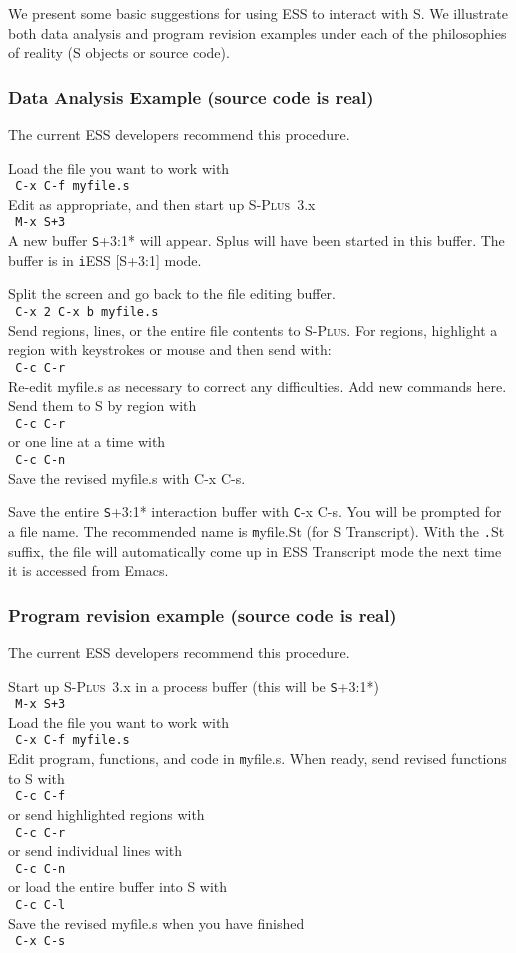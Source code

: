 \documentclass{article}
\newcommand*{\Splus}{\textsc{S-Plus}}
\newcommand{\elcode}[1]{\\{\texttt{\hspace*{2em} #1}}\\}
\begin{document}
We present some basic suggestions for using ESS to interact with S.
We illustrate both data analysis and program revision examples under each of
the philosophies of reality (S objects or source code).

\subsubsection{Data Analysis Example (source code is real)}
The current ESS developers recommend this procedure.

\noindent
Load the file you want to work with
  \elcode{C-x C-f myfile.s}
Edit as appropriate, and then start up \Splus~3.x
  \elcode{M-x S+3}
A new buffer {\texttt *S+3:1*} will appear.  Splus will have been started
in this buffer.  The buffer is in {\texttt iESS [S+3:1]} mode.

Split the screen and go back to the file editing buffer.
  \elcode{C-x 2 C-x b myfile.s}
Send regions, lines, or the entire file contents to \Splus.
For regions, highlight a region with keystrokes or mouse
and then send with:
  \elcode{C-c C-r}
Re-edit myfile.s as necessary to correct any difficulties.  Add
new commands here.  Send them to S by region with
  \elcode{C-c C-r}
or one line at a time with
  \elcode{C-c C-n}
Save the revised myfile.s with C-x C-s.

Save the entire {\texttt *S+3:1*} interaction buffer with {\texttt C-x C-s}.  You
will be prompted for a file name.  The recommended name is
{\texttt myfile.St} (for S Transcript).  With the {\texttt *.St} suffix,
the file will automatically come up in ESS
Transcript mode the next time it is accessed from Emacs.


\subsubsection{Program revision example (source code is real)}
The current ESS developers recommend this procedure.

\noindent
Start up \Splus~3.x in a process buffer (this will be {\texttt *S+3:1*})
  \elcode{M-x S+3}
Load the file you want to work with
  \elcode{C-x C-f myfile.s}
Edit program, functions, and code in {\texttt myfile.s}.
When ready, send revised functions to S with
  \elcode{C-c C-f}
or send highlighted regions with
  \elcode{C-c C-r}
or send individual lines with
  \elcode{C-c C-n}
or load the entire buffer into S with
  \elcode{C-c C-l}
Save the revised myfile.s when you have finished
  \elcode{C-x C-s}
\end{document}
